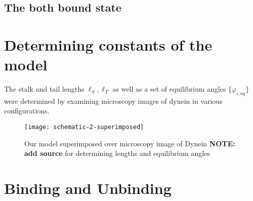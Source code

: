 		 
		\subsection{The both bound state}
		 
		\section{Determining constants of the model}
		The stalk and tail lengths $\ell_S, \ell_T$ as well as a set of equilibrium angles $\{\varphi_{i,\text{eq}}\}$ were determined by examining microscopy images of dynein in various configurations. 
		\begin{figure}[hbt!]
			\centering
			\texttt{[image: schematic-2-superimposed]}
			\caption{Our model superimposed over microscopy image of Dynein \textbf{NOTE: add source} for determining lengths and equilibrium angles} 
			\label{fig:superimpmosed}
		\end{figure}

	\section{Binding and Unbinding}
	

